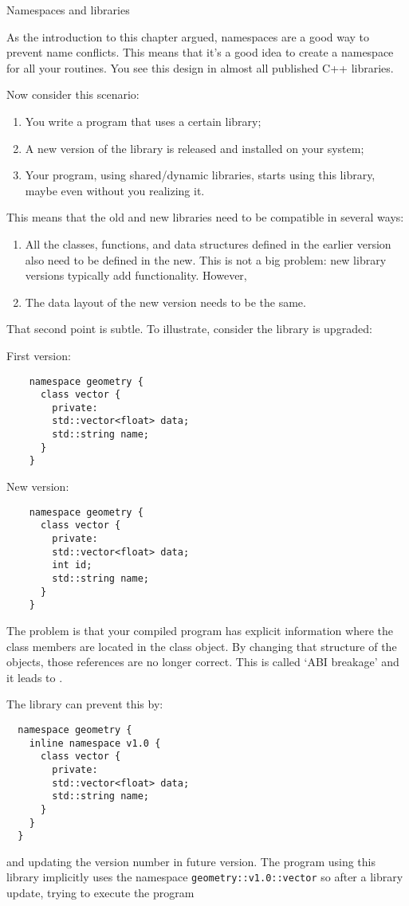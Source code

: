  {Namespaces and libraries}

As the introduction to this chapter argued,
namespaces are a good way to prevent name conflicts.
This means that it's a good idea to create a namespace
for all your routines.
You see this design in almost all published C++ libraries.

Now consider this scenario:
\begin{enumerate}
\item You write a program that uses a certain library;
\item A new version of the library is released and installed on your system;
\item Your program, using shared/dynamic libraries, starts using this library,
  maybe even without you realizing it.
\end{enumerate}
This means that the old and new libraries need to be compatible in several ways:
\begin{enumerate}
\item All the classes, functions, and data structures defined in the earlier version
  also need to be defined in the new. This is not a big problem: new library
  versions typically add functionality. However,
\item The data layout of the new version needs to be the same.
\end{enumerate}

That second point is subtle. To illustrate, consider the library
is upgraded:
\begin{multicols}{2}
  First version:
  \begin{lstlisting}
    namespace geometry {
      class vector {
        private:
        std::vector<float> data;
        std::string name;
      }
    }
  \end{lstlisting}
  \columnbreak
  New version:
  \begin{lstlisting}
    namespace geometry {
      class vector {
        private:
        std::vector<float> data;
        int id;
        std::string name;
      }
    }
  \end{lstlisting}
\end{multicols}

The problem is that your compiled program has explicit
information where the class members are located in the class object.
By changing that structure of the objects, those references are no longer correct.
This is called `\ac{ABI} breakage' and
it leads to .

The library can prevent this by:
\begin{lstlisting}
  namespace geometry {
    inline namespace v1.0 {
      class vector {
        private:
        std::vector<float> data;
        std::string name;
      }
    }
  }
\end{lstlisting}
and updating the version number in future version.
The program using this library implicitly uses the namespace
\lstinline+geometry::v1.0::vector+
so after a library update,
trying to execute the program

